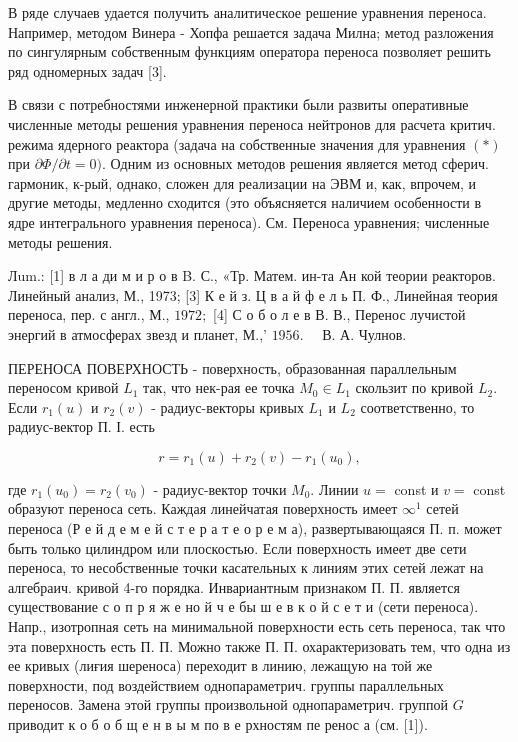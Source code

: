 \documentclass[10pt]{article}
\begin{document}
В ряде случаев удается получить аналитическое решение уравнения переноса. Например, методом Винера - Хопфа решается задача Милна; метод разложения по сингулярным собственным функциям оператора переноса позволяет решить ряд одномерных задач [3].

В связи с потребностями инженерной практики были развиты оперативные численные методы решения уравнения переноса нейтронов для расчета критич. режима ядерного реактора (задача на собственные значения для уравнения $(*)$ при $\partial \Phi / \partial t=0)$. Одним из основных методов решения является метод сферич. гармоник, к-рый, однако, сложен для реализации на ЭВМ и, как, впрочем, и другие методы, медленно сходится (это объясняется наличием особенности в ядре интегрального уравнения переноса). См. Переноса уравнения; численные методы решения.

Лum.: [1] в л а ди м и р о в B. С., «Тр. Матем. ин-та Ан кой теории реакторов. Линейный анализ, М., 1973; [3] К е й з. Ц в а й ф е л ь П. Ф., Линейная теория переноса, пер. с англ., М., $1972 ;$ [4] С о б о л е в В. В., Перенос лучистой энергий в атмосферах звезд и планет, М.,' $1956 . \quad$ В. А. Чулнов.

ПЕРЕНОСА ПОВЕРХНОСТЬ - поверхность, образованная параллельным переносом кривой $L_{1}$ так, что нек-рая ее точка $M_{0} \in L_{1}$ скользит по кривой $L_{2}$. Если $r_{1}(u)$ и $r_{2}(v)$ - радиус-векторы кривых $L_{1}$ и $L_{2}$ соответственно, то радиус-вектор П. І. есть

\[
r=r_{1}(u)+r_{2}(v)-r_{1}\left(u_{0}\right),
\]

где $r_{1}\left(u_{0}\right)=r_{2}\left(v_{0}\right)$ - радиус-вектор точки $M_{0}$. Линии $u=$ const и $v=$ const образуют переноса сеть. Каждая линейчатая поверхность имеет $\infty^{1}$ сетей переноса (Р е й д е м е й с т е р а т е о р е м а), развертывающаяся П. п. может быть только цилиндром или плоскостью. Если поверхность имеет две сети переноса, то несобственные точки касательных к линиям этих сетей лежат на алгебраич. кривой 4-го порядка. Инвариантным признаком П. П. является существование с о п р я ж е но й ч е бы ш е в к о й с е т и (сети переноса). Напр., изотропная сеть на минимальной поверхности есть сеть переноса, так что эта поверхность есть П. П. Можно также П. П. охарактеризовать тем, что одна из ее кривых (лиғия шереноса) переходит в линию, лежащую на той же поверхности, под воздействием однопараметрич. группы параллельных переносов. Замена этой группы произвольной однопараметрич. группой $G$ приводит к о б о б щ е н в ы м по в е рхностям пе ренос а (см. [1]).
\end{document}
